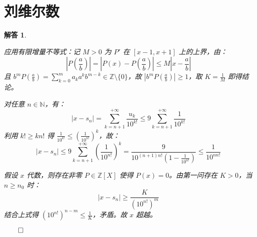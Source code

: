 \documentclass[12pt,UTF8]{ctexbook}
\theoremstyle{exercisestyle}
\theoremstyle{solutionstyle}
\newtheorem*{solution*}{解答}
\newenvironment{solution}
  {\begin{solution*}}
  {\hfill\ensuremath{\qed}\end{solution*}}
\begin{document}
\section{刘维尔数}
\begin{solution}
\begin{subquestions}
\item 应用有限增量不等式：记 $M > 0$ 为 $P'$ 在 $[x-1, x+1]$ 上的上界，由：
$$
\left| P\left(\frac{a}{b}\right) \right| = \left| P(x) - P\left(\frac{a}{b}\right) \right| \leq M \left| x - \frac{a}{b} \right|
$$
且 $b^m P\left(\frac{a}{b}\right) = \sum_{k=0}^m a_k a^k b^{m-k} \in \mathbb{Z} \setminus \{0\}$，故 $\left|b^m P\left(\frac{a}{b}\right)\right| \geq 1$，取 $K = \frac{1}{M}$ 即得结论。

\item 对任意 $n \in \mathbb{N}$，有：
$$
|x - s_n| = \sum_{k=n+1}^{+\infty} \frac{u_k}{10^{k!}} \leq 9 \sum_{k=n+1}^{+\infty} \frac{1}{10^{k!}}
$$
利用 $k! \geq kn!$ 得 $\frac{1}{10^{k!}} \leq \left(\frac{1}{10^{n!}}\right)^k$，故：
$$
|x - s_n| \leq 9 \sum_{k=n+1}^{+\infty} \left(\frac{1}{10^{n!}}\right)^k = \frac{9}{10^{(n+1)n!}(1 - \frac{1}{10^{n!}})} \leq \frac{1}{10^{nn!}}
$$

假设 $x$ 代数，则存在非零 $P \in \mathbb{Z}[X]$ 使得 $P(x)=0$。由第一问存在 $K>0$，当 $n \geq n_0$ 时：
$$
|x - s_n| \geq \frac{K}{(10^{n!})^m}
$$
结合上式得 $(10^{n!})^{n-m} \leq \frac{1}{K}$，矛盾。故 $x$ 超越。

\end{subquestions}
\end{solution}
\end{document}
